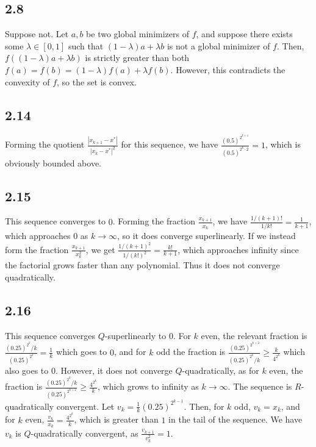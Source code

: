 \documentclass{article}
\begin{document}
\subsection*{2.8}
Suppose not. Let $a,b$ be two global minimizers of $f$, and suppose there exists some $\lambda\in[0,1]$ such that $(1-\lambda)a+\lambda b$ is not a global minimizer of $f$. Then, $f((1-\lambda)a+\lambda b)$ is strictly greater than both $f(a)=f(b)=(1-\lambda)f(a)+\lambda f(b)$. However, this contradicts the convexity of $f$, so the set is convex.
\subsection*{2.14}
Forming the quotient $\frac{|x_{k+1}-x^*|}{|x_k-x^*|^2}$ for this sequence, we have $\frac{(0.5)^{2^{k+1}}}{(0.5)^{2^{k}\cdot 2}}=1$, which is obviously bounded above.
\subsection*{2.15}
This sequence converges to $0$. Forming the fraction $\frac{x_{k+1}}{x_k}$, we have $\frac{1/(k+1)!}{1/k!}=\frac{1}{k+1}$, which approaches $0$ as $k\to\infty$, so it does converge superlinearly. If we instead form the fraction $\frac{x_{k+1}}{x_k^2}$, we get $\frac{1/(k+1)^2}{1/(k!)^2}=\frac{k!}{k+1}$, which approaches infinity since the factorial grows faster than any polynomial. Thus it does not converge quadratically.
\subsection*{2.16}
This sequence converges $Q$-superlinearly to $0$. For $k$ even, the relevant fraction is $\frac{(0.25)^{2^k}/k}{(0.25)^{2^k}}=\frac{1}{k}$ which goes to $0$, and for $k$ odd the fraction is $\frac{(0.25)^{2^{k+2}}}{(0.25)^{2^k}/k}\geq\frac{k}{4^{2^k}}$ which also goes to $0$. However, it does not converge $Q$-quadratically, as for $k$ even, the fraction is $\frac{(0.25)^{2^k}/k}{(0.25)^{2^{k+2}}}\geq\frac{4^{2^k}}{k}$, which grows to infinity as $k\to\infty$. The sequence is $R$-quadratically convergent. Let $v_k=\frac{1}{k}(0.25)^{2^{k-1}}$. Then, for $k$ odd, $v_k=x_k$, and for $k$ even, $\frac{v_k}{x_k}=\frac{4^{2^k}}{k}$, which is greater than $1$ in the tail of the sequence. We have $v_k$ is $Q$-quadratically convergent, as $\frac{v_{k+1}}{v_k^2}=1$.
\end{document}
